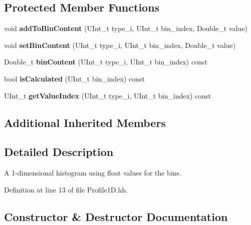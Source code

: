 \subsection*{Protected Member Functions}
\begin{DoxyCompactItemize}
\item 
void {\bfseries add\-To\-Bin\-Content} (U\-Int\-\_\-t type\-\_\-i, U\-Int\-\_\-t bin\-\_\-index, Double\-\_\-t value)\label{classhistmgr_1_1Profile1D_aadc85fd4d567c7eb28a7b4da4741ebc4}

\item 
void {\bfseries set\-Bin\-Content} (U\-Int\-\_\-t type\-\_\-i, U\-Int\-\_\-t bin\-\_\-index, Double\-\_\-t value)\label{classhistmgr_1_1Profile1D_a7a35e0ae5777ff5f9b96c7cd19c68a23}

\item 
Double\-\_\-t {\bfseries bin\-Content} (U\-Int\-\_\-t type\-\_\-i, U\-Int\-\_\-t bin\-\_\-index) const \label{classhistmgr_1_1Profile1D_a25ff38a444a39ce2105c287e0acf3955}

\item 
bool {\bfseries is\-Calculated} (U\-Int\-\_\-t bin\-\_\-index) const \label{classhistmgr_1_1Profile1D_affb2a5a6c6de2b2629ba827fff24876c}

\item 
U\-Int\-\_\-t {\bfseries get\-Value\-Index} (U\-Int\-\_\-t type\-\_\-i, U\-Int\-\_\-t bin\-\_\-index) const \label{classhistmgr_1_1Profile1D_a27b869379f7ac5024adadf2c3a6ff848}

\end{DoxyCompactItemize}
\subsection*{Additional Inherited Members}


\subsection{Detailed Description}
A 1-\/dimensional histogram using float values for the bins. 

Definition at line 13 of file Profile1\-D.\-hh.



\subsection{Constructor \& Destructor Documentation}
